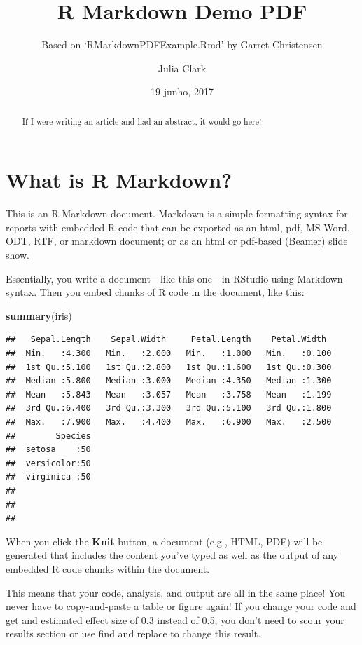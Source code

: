 \documentclass[11pt,]{article}
\title{R Markdown Demo PDF}
\subtitle{Based on `RMarkdownPDFExample.Rmd' by Garret Christensen}
\author{Julia Clark}
\date{19 junho, 2017}
\newenvironment{Shaded}{\begin{snugshade}}{\end{snugshade}}
\newcommand{\KeywordTok}[1]{\textcolor[rgb]{0.13,0.29,0.53}{\textbf{{#1}}}}
\newcommand{\NormalTok}[1]{{#1}}
\begin{document}
\maketitle
\begin{abstract}
If I were writing an article and had an abstract, it would go here!
\end{abstract}

\section{What is R Markdown?}\label{what-is-r-markdown}

This is an R Markdown document. Markdown is a simple formatting syntax
for reports with embedded R code that can be exported as an html, pdf,
MS Word, ODT, RTF, or markdown document; or as an html or pdf-based
(Beamer) slide show.

Essentially, you write a document---like this one---in RStudio using
Markdown syntax. Then you embed chunks of R code in the document, like
this:

\begin{Shaded}
\begin{Highlighting}[]
\KeywordTok{summary}\NormalTok{(iris)}
\end{Highlighting}
\end{Shaded}

\begin{verbatim}
##   Sepal.Length    Sepal.Width     Petal.Length    Petal.Width   
##  Min.   :4.300   Min.   :2.000   Min.   :1.000   Min.   :0.100  
##  1st Qu.:5.100   1st Qu.:2.800   1st Qu.:1.600   1st Qu.:0.300  
##  Median :5.800   Median :3.000   Median :4.350   Median :1.300  
##  Mean   :5.843   Mean   :3.057   Mean   :3.758   Mean   :1.199  
##  3rd Qu.:6.400   3rd Qu.:3.300   3rd Qu.:5.100   3rd Qu.:1.800  
##  Max.   :7.900   Max.   :4.400   Max.   :6.900   Max.   :2.500  
##        Species  
##  setosa    :50  
##  versicolor:50  
##  virginica :50  
##                 
##                 
## 
\end{verbatim}

When you click the \textbf{Knit} button, a document (e.g., HTML, PDF)
will be generated that includes the content you've typed as well as the
output of any embedded R code chunks within the document.

This means that your code, analysis, and output are all in the same
place! You never have to copy-and-paste a table or figure again! If you
change your code and get and estimated effect size of 0.3 instead of
0.5, you don't need to scour your results section or use find and
replace to change this result.
\end{document}

